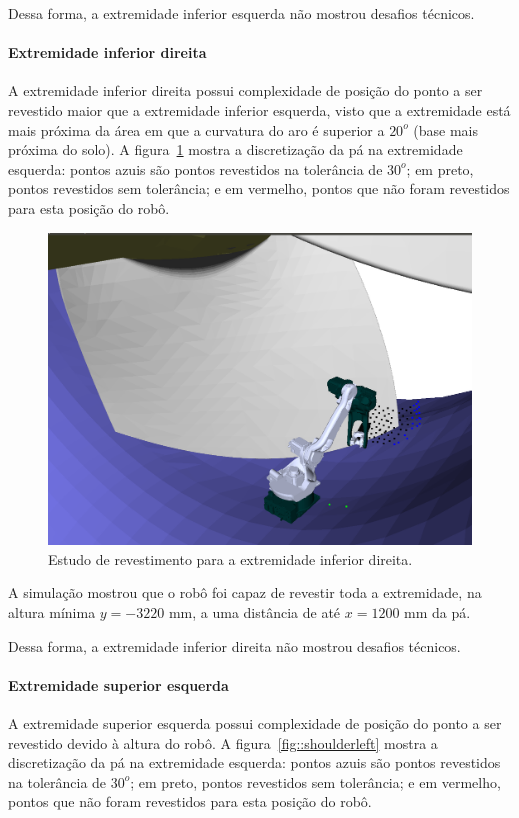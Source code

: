 Dessa forma, a extremidade inferior esquerda não mostrou desafios técnicos.

\paragraph{Extremidade inferior direita}

A extremidade inferior direita possui complexidade de posição do ponto a
ser revestido maior que a extremidade inferior esquerda, visto que a extremidade
está mais próxima da área em que a curvatura do aro é superior a $20^o$ (base
mais próxima do solo). A figura~\ref{fig::footright} mostra a discretização da
pá na extremidade esquerda: pontos azuis são pontos revestidos na tolerância de
$30^o$; em preto, pontos revestidos sem tolerância; e em vermelho, pontos que
não foram revestidos para esta posição do robô.

\begin{figure}[!ht]
	\centering	
	\includegraphics[width=.5\columnwidth]{figs/footright.png}
	\caption{Estudo de revestimento para a extremidade inferior direita.}
	\label{fig::footright}
\end{figure}

A simulação mostrou que o robô foi capaz de revestir toda a extremidade, na
altura mínima $y=-3220$ mm, a uma distância de até $x=1200$ mm da pá. 

Dessa forma, a extremidade inferior direita não mostrou desafios técnicos.

\paragraph{Extremidade superior esquerda}\label{superioresquerda}

A extremidade superior esquerda possui complexidade de posição do ponto a
ser revestido devido à altura do robô. A figura~\ref{fig::shoulderleft} mostra
a discretização da pá na extremidade esquerda: pontos azuis são pontos revestidos na tolerância de
$30^o$; em preto, pontos revestidos sem tolerância; e em vermelho, pontos que
não foram revestidos para esta posição do robô.

